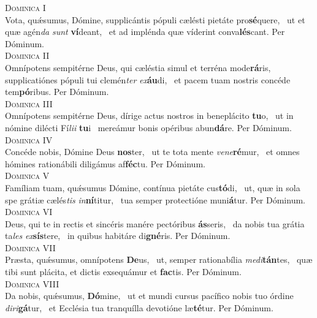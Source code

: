 \begin{translatioMulticol}{2}
{\color{red}\textsc{Dominica I}}\\
Vota, quǽsumus, Dómine, supplicántis pópuli cælésti pietáte pro\textbf{sé}quere,~\gredagger{}
ut et quæ agén\textit{da} \textit{sunt} \textbf{ví}deant,~\grestar{}
et ad implénda quæ víderint conva\textbf{lés}cant. Per Dóminum.\\
{\color{red}\textsc{Dominica II}}\\
Omnípotens sempitérne Deus, qui cæléstia simul et terréna mode\textbf{rá}ris,~\gredagger{}
supplicatiónes pópuli tui clemén\textit{ter} \textit{ex}\textbf{áu}di,~\grestar{}
et pacem tuam nostris concéde tem\textbf{pó}ribus. Per Dóminum.\\
{\color{red}\textsc{Dominica III}}\\
Omnípotens sempitérne Deus, dírige actus nostros in beneplácito \textbf{tu}o,~\gredagger{}
ut in nómine dilécti Fí\textit{li}\textit{i} \textbf{tu}i~\grestar{}
mereámur bonis opéribus abun\textbf{dá}re. Per Dóminum.\\
{\color{red}\textsc{Dominica IV}}\\
Concéde nobis, Dómine Deus \textbf{nos}ter,~\gredagger{}
ut te tota mente \textit{ve}\textit{ne}\textbf{ré}mur,~\grestar{}
et omnes hómines rationábili diligámus af\textbf{féc}tu. Per Dóminum.\\
{\color{red}\textsc{Dominica V}}\\
Famíliam tuam, quǽsumus Dómine, contínua pietáte cus\textbf{tó}di,~\gredagger{}
ut, quæ in sola spe grátiæ cælés\textit{tis} \textit{in}\textbf{ní}titur,~\grestar{}
tua semper protectióne muni\textbf{á}tur. Per Dóminum.\\
{\color{red}\textsc{Dominica VI}}\\
Deus, qui te in rectis et sincéris manére pectóribus \textbf{ás}seris,~\gredagger{}
da nobis tua grátia ta\textit{les} \textit{ex}\textbf{sís}tere,~\grestar{}
in quibus habitáre di\textbf{gné}ris. Per Dóminum.\\
{\color{red}\textsc{Dominica VII}}\\
Præsta, quǽsumus, omnípotens \textbf{De}us,~\gredagger{}
ut, semper rationabília \textit{me}\textit{di}\textbf{tán}tes,~\grestar{}
quæ tibi sunt plácita, et dictis exsequámur et \textbf{fac}tis. Per Dóminum.\\
{\color{red}\textsc{Dominica VIII}}\\
Da nobis, quǽsumus, \textbf{Dó}mine,~\gredagger{}
ut et mundi cursus pacífico nobis tuo órdine \textit{di}\textit{ri}\textbf{gá}tur,~\grestar{}
et Ecclésia tua tranquílla devotióne læ\textbf{té}tur. Per Dóminum.\columnbreak


\end{translatioMulticol}
